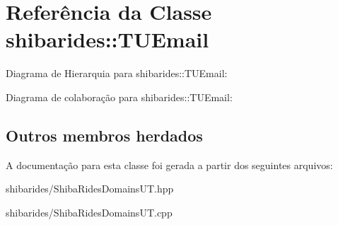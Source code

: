 \hypertarget{classshibarides_1_1TUEmail}{}\section{Referência da Classe shibarides\+:\+:T\+U\+Email}
\label{classshibarides_1_1TUEmail}


Diagrama de Hierarquia para shibarides\+:\+:T\+U\+Email\+:


Diagrama de colaboração para shibarides\+:\+:T\+U\+Email\+:
\subsection*{Outros membros herdados}


A documentação para esta classe foi gerada a partir dos seguintes arquivos\+:\begin{DoxyCompactItemize}
\item 
shibarides/Shiba\+Rides\+Domains\+U\+T.\+hpp\item 
shibarides/Shiba\+Rides\+Domains\+U\+T.\+cpp\end{DoxyCompactItemize}
